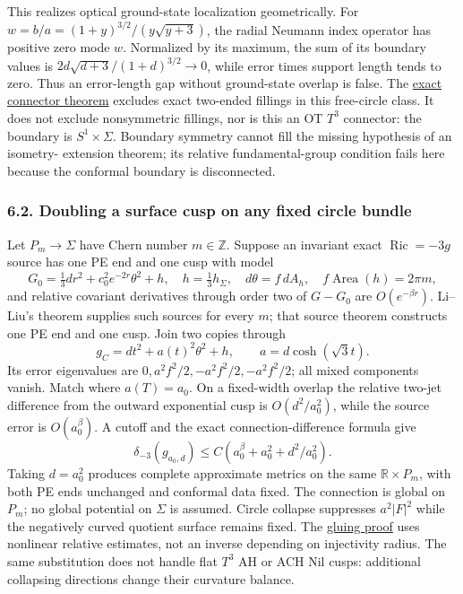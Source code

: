 \documentclass[
  english,
]{article}
\begin{document}
This realizes optical ground-state localization geometrically. For
\(w=b/a=(1+y)^{3/2}/(y\sqrt{y+3})\), the radial Neumann index operator
has positive zero mode \(w\). Normalized by its maximum, the sum of its
boundary values is \(2d\sqrt{d+3}/(1+d)^{3/2}\to0\), while error times
support length tends to zero. Thus an error-length gap without
ground-state overlap is false. The
\href{../proofs/round9_connector.md}{exact connector theorem} excludes
exact two-ended fillings in this free-circle class. It does not exclude
nonsymmetric fillings, nor is this an OT \(T^3\) connector: the boundary
is \(S^1\times\Sigma\). Boundary symmetry cannot fill the missing
hypothesis of an isometry- extension theorem; its relative
fundamental-group condition fails here because the conformal boundary is
disconnected.

\hypertarget{doubling-a-surface-cusp-on-any-fixed-circle-bundle}{%
\subsubsection{6.2. Doubling a surface cusp on any fixed circle
bundle}\label{doubling-a-surface-cusp-on-any-fixed-circle-bundle}}

Let \(P_m\to\Sigma\) have Chern number \(m\in\mathbb Z\). Suppose an
invariant exact \(\operatorname{Ric}=-3g\) source has one PE end and one
cusp with model \[
G_0=\tfrac13dr^2+c_0^2e^{-2r}\theta^2+h,\quad
h=\tfrac13h_\Sigma,\quad d\theta=f\,dA_h,\quad
f\operatorname{Area}(h)=2\pi m,
\] and relative covariant derivatives through order two of \(G-G_0\) are
\(O(e^{-\beta r})\). Li--Liu's theorem supplies such sources for every
\(m\); that source theorem constructs one PE end and one cusp. Join two
copies through \[
g_C=dt^2+a(t)^2\theta^2+h,\qquad a=d\cosh(\sqrt3t).
\] Its error eigenvalues are \(0,a^2f^2/2,-a^2f^2/2,-a^2f^2/2\); all
mixed components vanish. Match where \(a(T)=a_0\). On a fixed-width
overlap the relative two-jet difference from the outward exponential
cusp is \(O(d^2/a_0^2)\), while the source error is \(O(a_0^\beta)\). A
cutoff and the exact connection-difference formula give \[
\delta_{-3}(g_{a_0,d})\le C(a_0^\beta+a_0^2+d^2/a_0^2).
\tag{6.3}
\] Taking \(d=a_0^2\) produces complete approximate metrics on the same
\(\mathbb R\times P_m\), with both PE ends unchanged and conformal data
fixed. The connection is global on \(P_m\); no global potential on
\(\Sigma\) is assumed. Circle collapse suppresses \(a^2|F|^2\) while the
negatively curved quotient surface remains fixed. The
\href{../proofs/round10_cusp_doubling.md}{gluing proof} uses nonlinear
relative estimates, not an inverse depending on injectivity radius. The
same substitution does not handle flat \(T^3\) AH or ACH Nil cusps:
additional collapsing directions change their curvature balance.
\end{document}
